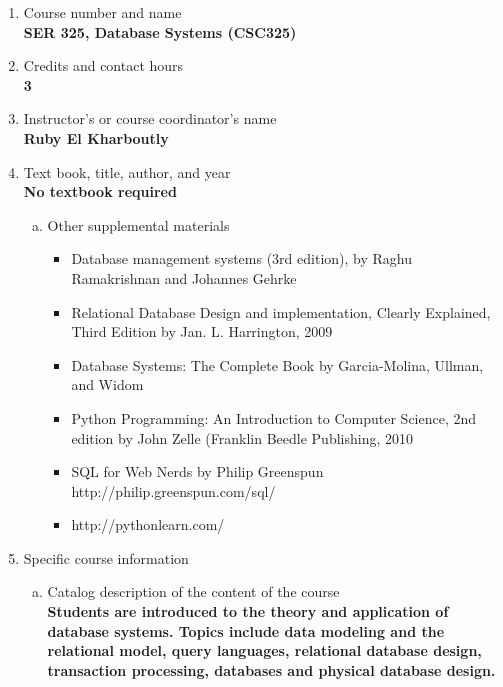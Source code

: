 \label{SER325}  %
\begin{enumerate}[1.]
\item Course number and name\\
  {\bfseries
    SER 325, Database Systems (CSC325)
  }

\item Credits and contact hours\\
  {\bfseries
    3  %
  }

\item Instructor's or course coordinator's name\\
  {\bfseries
    Ruby El Kharboutly
  }

\item Text book, title, author, and year\\
  {\bfseries
    No textbook required
  }
\begin{enumerate}[a.]
\item Other supplemental materials\\
  {\bfseries
      \begin{itemize}
        \item Database management systems (3rd edition), by Raghu Ramakrishnan and Johannes Gehrke
        \item Relational Database Design and implementation, Clearly Explained, Third Edition by Jan. L.
Harrington, 2009
        \item Database Systems: The Complete Book by Garcia-Molina, Ullman, and Widom
        \item Python Programming: An Introduction to Computer Science, 2nd edition by John Zelle (Franklin
Beedle Publishing, 2010
        \item SQL for Web Nerds by Philip Greenspun http://philip.greenspun.com/sql/
        \item http://pythonlearn.com/
      \end{itemize}
  }
\end{enumerate}

\item Specific course information
\begin{enumerate}[a.]
\item Catalog description of the content of the course\\
  {\bfseries
    Students are introduced to the theory and application of database systems. Topics include data
modeling and the relational model, query languages, relational database design, transaction
processing, databases and physical database design.
  }


\end{enumerate}
\end{enumerate}
